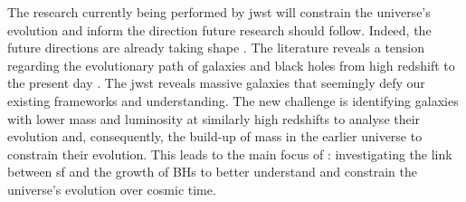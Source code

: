 The research currently being performed by \gls{jwst} will constrain the universe's evolution and inform the direction future research should follow. Indeed, the future directions are already taking shape \citep{labbe_population_2023}. The literature reveals a tension regarding the evolutionary path of galaxies and black holes from high redshift to the present day \citep{ziparo_primordial_2024}. The \gls{jwst} reveals massive galaxies that seemingly defy our existing frameworks and understanding. The new challenge is identifying galaxies with lower mass and luminosity at similarly high redshifts to analyse their evolution and, consequently, the build-up of mass in the earlier universe to constrain their evolution. This leads to the main focus of \cite{lyon_decomposing_2024}: investigating the link between \gls{sf} and the growth of BHs to better understand and constrain the universe's evolution over cosmic time.